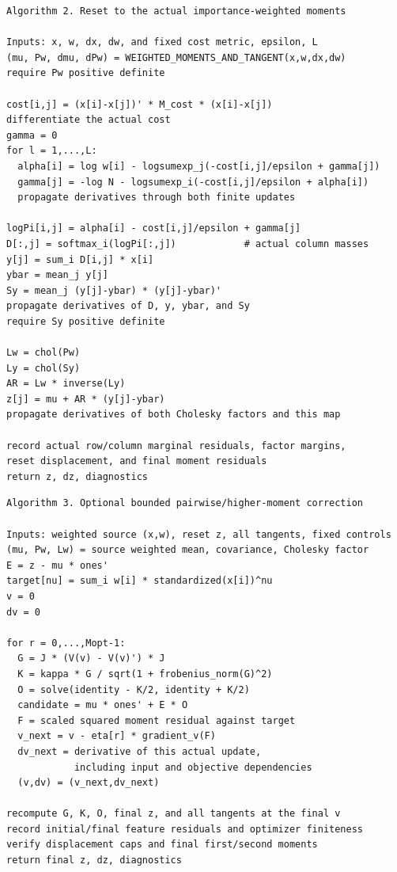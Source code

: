 \noindent\begin{minipage}{\linewidth}
\begin{lstlisting}
Algorithm 2. Reset to the actual importance-weighted moments

Inputs: x, w, dx, dw, and fixed cost metric, epsilon, L
(mu, Pw, dmu, dPw) = WEIGHTED_MOMENTS_AND_TANGENT(x,w,dx,dw)
require Pw positive definite

cost[i,j] = (x[i]-x[j])' * M_cost * (x[i]-x[j])
differentiate the actual cost
gamma = 0
for l = 1,...,L:
  alpha[i] = log w[i] - logsumexp_j(-cost[i,j]/epsilon + gamma[j])
  gamma[j] = -log N - logsumexp_i(-cost[i,j]/epsilon + alpha[i])
  propagate derivatives through both finite updates

logPi[i,j] = alpha[i] - cost[i,j]/epsilon + gamma[j]
D[:,j] = softmax_i(logPi[:,j])            # actual column masses
y[j] = sum_i D[i,j] * x[i]
ybar = mean_j y[j]
Sy = mean_j (y[j]-ybar) * (y[j]-ybar)'
propagate derivatives of D, y, ybar, and Sy
require Sy positive definite

Lw = chol(Pw)
Ly = chol(Sy)
AR = Lw * inverse(Ly)
z[j] = mu + AR * (y[j]-ybar)
propagate derivatives of both Cholesky factors and this map

record actual row/column marginal residuals, factor margins,
reset displacement, and final moment residuals
return z, dz, diagnostics
\end{lstlisting}
\end{minipage}

\noindent\begin{minipage}{\linewidth}
\begin{lstlisting}
Algorithm 3. Optional bounded pairwise/higher-moment correction

Inputs: weighted source (x,w), reset z, all tangents, fixed controls
(mu, Pw, Lw) = source weighted mean, covariance, Cholesky factor
E = z - mu * ones'
target[nu] = sum_i w[i] * standardized(x[i])^nu
v = 0
dv = 0

for r = 0,...,Mopt-1:
  G = J * (V(v) - V(v)') * J
  K = kappa * G / sqrt(1 + frobenius_norm(G)^2)
  O = solve(identity - K/2, identity + K/2)
  candidate = mu * ones' + E * O
  F = scaled squared moment residual against target
  v_next = v - eta[r] * gradient_v(F)
  dv_next = derivative of this actual update,
            including input and objective dependencies
  (v,dv) = (v_next,dv_next)

recompute G, K, O, final z, and all tangents at the final v
record initial/final feature residuals and optimizer finiteness
verify displacement caps and final first/second moments
return final z, dz, diagnostics
\end{lstlisting}
\end{minipage}

